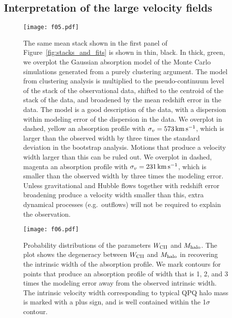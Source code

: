\documentclass[iop]{emulateapj}
\begin{document}
\subsection{Interpretation of the large velocity fields}
\label{sec:significance_width}

\begin{figure}
\texttt{[image: f05.pdf]}
\caption{The same  mean stack shown in the first panel of 
Figure~\ref{fig:stacks_and_fits} is shown in thin, black. In thick, green, we overplot the 
Gaussian absorption model of the Monte Carlo simulations generated from a purely clustering 
argument. The model from clustering analysis is multiplied to the pseudo-continuum level of the 
stack of the observational data, shifted to the centroid of the stack of the data, and broadened 
by the mean redshift error in the data. The model is a good description of the data, with a 
dispersion within modeling error of the dispersion in the data. We overplot in dashed, yellow an 
absorption profile with $\sigma_v=573\,{\rm km\,s^{-1}}$, which is larger than the observed width 
by three times the standard deviation in the bootstrap analysis. Motions that produce a velocity 
width larger than this can be ruled out. We overplot in dashed, magenta an absorption profile with 
$\sigma_v=231\,{\rm km\,s^{-1}}$, which is smaller than the observed width by three times the 
modeling error. Unless gravitational and Hubble flows together with redshift error broadening 
produce a velocity width smaller than this, extra dynamical processes (e.g.\ outflows) will not be 
required to explain the observation. 
}
\label{fig:monte}
\end{figure}

\begin{figure}
\texttt{[image: f06.pdf]}
\caption{
Probability distributions of the parameters $W_{\rm CII}$ and $M_{\rm halo}$. The plot shows the 
degeneracy between $W_{\rm CII}$ and $M_{\rm halo}$ in recovering the intrinsic width of the 
absorption profile. We mark contours for points that produce an absorption 
profile of width that is 1, 2, and 3 times the modeling error away from the observed intrinsic 
width. The intrinsic velocity width corresponding to typical QPQ halo mass is marked with a plus 
sign, and is well contained within the 1$\sigma$ contour.}
\label{fig:contour}
\end{figure}
\end{document}
